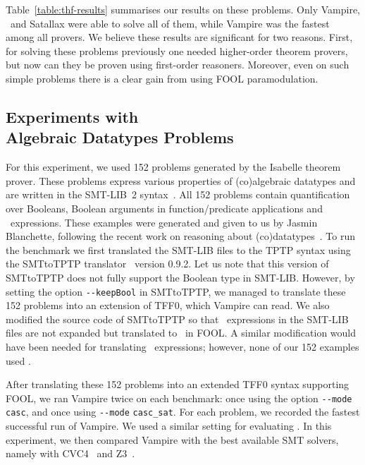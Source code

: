 Table~\ref{table:thf-results} summarises our results on these problems. Only Vampire, \nofoolVampire\ and Satallax were able to solve all of them, while
Vampire was the fastest among all provers. We believe these results
are significant for two reasons. First, for solving these problems
previously one 
needed higher-order theorem provers, but now can they be proven using first-order reasoners. Moreover, even on such simple problems there is a clear gain from using FOOL paramodulation.


\subsection[Experiments with Algebraic Datatypes Problems]{Experiments with\\Algebraic Datatypes Problems}
\label{subsec:Isabelle}

For this experiment, we used 152 problems generated by the Isabelle theorem prover. These
problems express various properties of (co)algebraic datatypes and are written in the SMT-LIB~2 syntax~\cite{SMT-LIB}. All 152 problems contain quantification over Booleans, Boolean arguments in function/predicate applications and \ITE\ expressions. These examples were generated and given to us by Jasmin Blanchette, following the recent work on reasoning about (co)datatypes~\cite{Blanchette15}. To run the benchmark we first translated the SMT-LIB files to the TPTP syntax using the SMTtoTPTP translator~\cite{SMTLIB2TPTP} version 0.9.2.
Let us note that this version of SMTtoTPTP does not fully support the
Boolean type in SMT-LIB. However, by setting the option
\verb'--keepBool' in SMTtoTPTP, we managed to translate these 152
problems into an extension of TFF0, which Vampire can read.
We also modified the source code of  SMTtoTPTP so that  \ITE\
expressions in the SMT-LIB files are not expanded but translated to \dite\
in FOOL. A similar modification would have been needed for translating
\LETIN\ expressions; however, none of our 152 examples used \LETIN.

After translating these 152 problems into an extended TFF0 syntax
supporting FOOL, we ran Vampire twice on each benchmark: once using the
option \verb'--mode casc', and once using
\verb'--mode' \verb'casc_sat'.  For each problem, we recorded the
fastest successful run of Vampire. We used a similar setting for
evaluating \nofoolVampire.
In this experiment, we then compared Vampire with
the best available SMT solvers, namely with CVC4~\cite{CVC4} and
Z3~\cite{Z3}.

